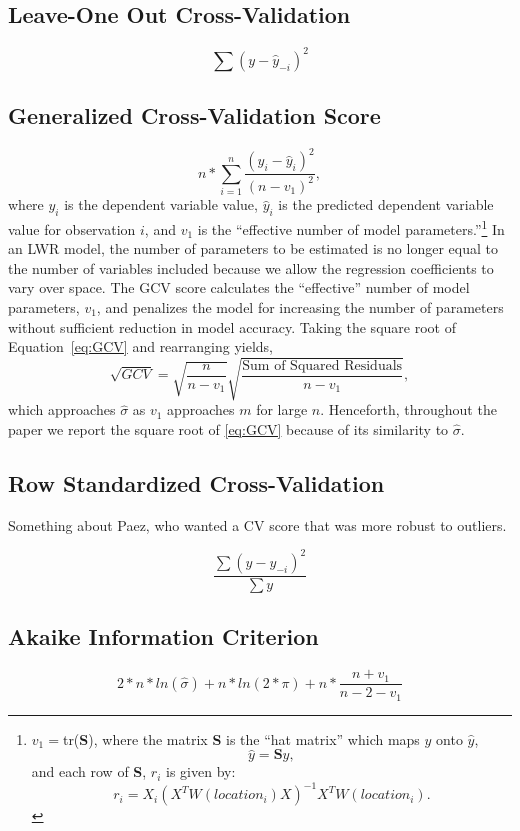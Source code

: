 \documentclass{article}
\begin{document}
\subsection{Leave-One Out Cross-Validation}

\begin{equation}
\sum (y - \hat{y}_{-i})^2
\end{equation}

\subsection{Generalized Cross-Validation Score}
\begin{equation}\label{eq:GCV}
  n*\sum_{i=1}^{n}\frac{(y_i-\hat{y}_i)^2}{(n-v_1)^2}, 
  \end{equation}
where $y_i$ is the dependent variable value, $\hat{y}_i$ is the predicted dependent variable value for observation $i$, and $v_1$ is the ``effective number of model parameters.''\footnote{
  $v_1=$tr(\textbf{S}), where the matrix \textbf{S} is the ``hat matrix'' which maps $y$ onto $\hat{y}$,
\begin{equation*}
  \hat{y}=\textbf{S}y,
  \end{equation*}
  and each row of \textbf{S}, $r_i$ is given by:
  \begin{equation*}
    r_i=X_i(X^TW(location_i)X)^{-1}X^TW(location_i).
    \end{equation*}
}
In an LWR model, the number of parameters to be estimated is no longer equal to the number of variables included because we allow the regression coefficients to vary over space. The GCV score calculates the ``effective'' number of model parameters, $v_1$, and penalizes the model for increasing the number of parameters without sufficient reduction in model accuracy. Taking the square root of Equation~\eqref{eq:GCV} and rearranging yields,
\begin{equation}
  \sqrt{GCV}=\sqrt{\frac{n}{n-v_1}} \sqrt{\frac{\textrm{Sum of Squared Residuals}}{n-v_1}},
\end{equation}
which approaches $\hat{\sigma}$ as $v_1$ approaches $m$ for large $n$. Henceforth, throughout the paper we report the square root of \eqref{eq:GCV} because of its similarity to $\hat{\sigma}$.  

\subsection{Row Standardized Cross-Validation}

Something about Paez, who wanted a CV score that was more robust to outliers.

\begin{equation}\label{eq:SCV}
\frac{\sum (y - y_{-i})^2} {\sum y}
\end{equation}

\subsection{Akaike Information Criterion}

\begin{equation}\label{eq:AIC}
  2*n*ln(\hat{\sigma}) + n*ln(2*\pi) + 
    n*\frac{n + v_1}{n - 2 - v_1}
    \end{equation}
\end{document}
